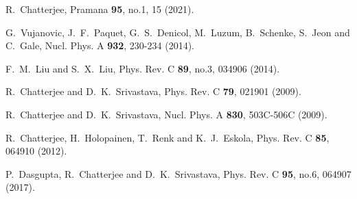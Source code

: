 \documentclass[aps,prc,twocolumn,floatfix,12pts,superscriptaddress]{revtex4}
\begin{document}
{{\begin{thebibliography}{99}
R.~Chatterjee,
Pramana \textbf{95}, no.1, 15 (2021).


G.~Vujanovic, J.~F.~Paquet, G.~S.~Denicol, M.~Luzum, B.~Schenke, S.~Jeon and C.~Gale,
Nucl. Phys. A \textbf{932}, 230-234 (2014).

F.~M.~Liu and S.~X.~Liu,
Phys. Rev. C \textbf{89}, no.3, 034906 (2014).


R.~Chatterjee and D.~K.~Srivastava,
Phys. Rev. C \textbf{79}, 021901 (2009).

R.~Chatterjee and D.~K.~Srivastava,
Nucl. Phys. A \textbf{830}, 503C-506C (2009).

R.~Chatterjee, H.~Holopainen, T.~Renk and K.~J.~Eskola,
Phys. Rev. C \textbf{85}, 064910 (2012).

P.~Dasgupta, R.~Chatterjee and D.~K.~Srivastava,
Phys. Rev. C \textbf{95}, no.6, 064907 (2017).



\end{thebibliography}}}
\end{document}
